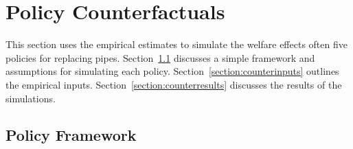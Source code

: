 \documentclass[12pt,table]{article}
\begin{document}
\section{Policy Counterfactuals}\label{section:counter}


This section uses the empirical estimates to simulate the welfare effects often five policies for replacing pipes.  Section~\ref{section:countermodel} discusses a simple framework and assumptions for simulating each policy.  Section~\ref{section:counterinputs} outlines the empirical inputs.  Section~\ref{section:counterresults} discusses the results of the simulations.




\subsection{Policy Framework}\label{section:countermodel}
\end{document}

